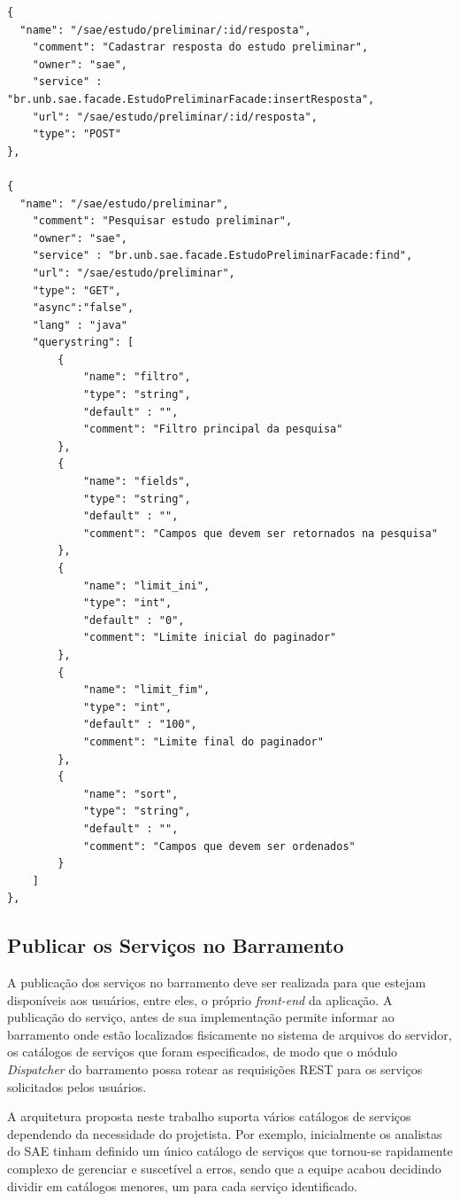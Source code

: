 \renewcommand{\lstlistingname}{Código}             
\begin{lstlisting}[caption=Especificação parcial da API do serviço estudo\_preliminar., label=fig:catalogo_processo] 
{
  "name": "/sae/estudo/preliminar/:id/resposta",
	"comment": "Cadastrar resposta do estudo preliminar",
	"owner": "sae",
	"service" : "br.unb.sae.facade.EstudoPreliminarFacade:insertResposta",
	"url": "/sae/estudo/preliminar/:id/resposta",
	"type": "POST"
},

{
  "name": "/sae/estudo/preliminar",
	"comment": "Pesquisar estudo preliminar",
	"owner": "sae",
	"service" : "br.unb.sae.facade.EstudoPreliminarFacade:find",
	"url": "/sae/estudo/preliminar",
	"type": "GET",
	"async":"false",
	"lang" : "java"
	"querystring": [
		{
			"name": "filtro",
			"type": "string",
			"default" : "",
			"comment": "Filtro principal da pesquisa"
		},
		{
			"name": "fields",
			"type": "string",
			"default" : "",
			"comment": "Campos que devem ser retornados na pesquisa"
		},
		{
			"name": "limit_ini",
			"type": "int",
			"default" : "0",
			"comment": "Limite inicial do paginador"
		},
		{
			"name": "limit_fim",
			"type": "int",
			"default" : "100",
			"comment": "Limite final do paginador"
		},
		{
			"name": "sort",
			"type": "string",
			"default" : "",
			"comment": "Campos que devem ser ordenados"
		}
	]
},

\end{lstlisting}


\subsection{Publicar os Serviços no Barramento}

A publicação dos serviços 
no barramento deve ser realizada para que  
estejam disponíveis aos usuários, entre eles, o próprio
\textit{front-end} da aplicação.
A publicação do serviço, antes 
de sua implementação permite
informar ao barramento 
onde estão localizados fisicamente no
sistema de arquivos do servidor, 
os catálogos de serviços 
que foram especificados, 
de modo que o 
módulo \textit{Dispatcher}
do barramento possa 
rotear as requisições \acrshort{REST} 
para os serviços solicitados pelos usuários.

A arquitetura proposta neste trabalho
suporta vários 
catálogos de serviços
dependendo da necessidade 
do projetista.
Por exemplo, inicialmente
os analistas do \acrshort{SAE} 
tinham definido
um único catálogo de serviços
que tornou-se rapidamente 
complexo de gerenciar e
suscetível a erros, sendo que
a equipe acabou decidindo dividir
em catálogos menores, um para cada serviço identificado.

